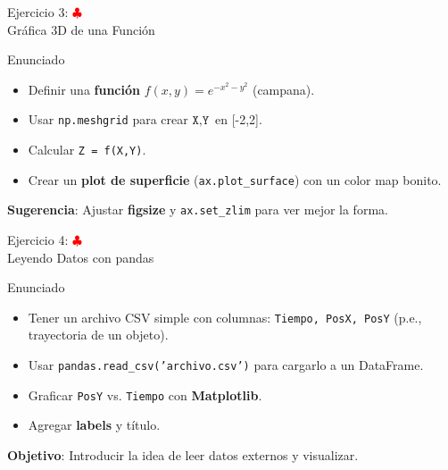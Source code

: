 \documentclass[10pt]{beamer}
\begin{document}
\begin{frame}{Ejercicio 3: \hfill \textcolor{red}{$\clubsuit$} \\ Gráfica 3D de una Función}
  \begin{block}{Enunciado}
    \begin{itemize}
      \item Definir una \textbf{función} \(f(x,y) = e^{-x^2 - y^2}\) (campana).
      \item Usar \texttt{np.meshgrid} para crear \(\texttt{X}, \texttt{Y}\) en [-2,2].
      \item Calcular \texttt{Z = f(X,Y)}.
      \item Crear un \textbf{plot de superficie} (\texttt{ax.plot\_surface}) con un color map bonito.
    \end{itemize}
  \end{block}
  \textbf{Sugerencia}: Ajustar \textbf{figsize} y \texttt{ax.set\_zlim} para ver mejor la forma.
\end{frame}




\begin{frame}{Ejercicio 4: \hfill \textcolor{red}{$\clubsuit$} \\ Leyendo Datos con pandas}
  \begin{block}{Enunciado}
    \begin{itemize}
      \item Tener un archivo CSV simple con columnas: \texttt{Tiempo, PosX, PosY} (p.e., trayectoria de un objeto).
      \item Usar \texttt{pandas.read\_csv('archivo.csv')} para cargarlo a un DataFrame.
      \item Graficar \texttt{PosY} vs. \texttt{Tiempo} con \textbf{Matplotlib}.
      \item Agregar \textbf{labels} y título.
    \end{itemize}
  \end{block}
  \textbf{Objetivo}: Introducir la idea de leer datos externos y visualizar.
\end{frame}


\ifshowsolutions
\end{document}
